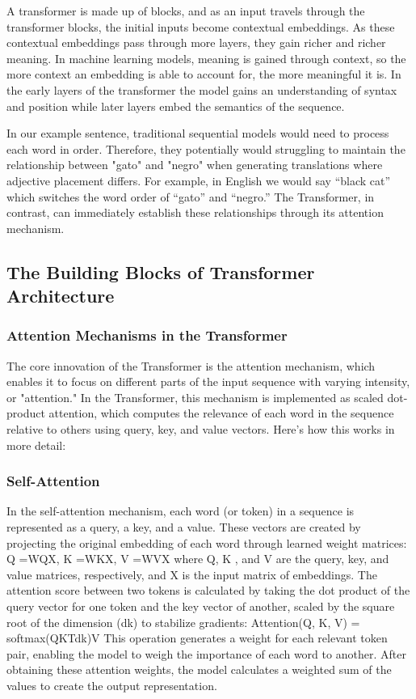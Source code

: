 A transformer is made up of blocks, and as an input travels through the transformer blocks, the initial inputs become contextual embeddings. As these contextual embeddings pass through more layers, they gain richer and richer meaning. In machine learning models, meaning is gained through context, so the more context an embedding is able to account for, the more meaningful it is. In the early layers of the transformer the model gains an understanding of syntax and position while later layers embed the semantics of the sequence. 

In our example sentence, traditional sequential models would need to process each word in order. Therefore, they potentially would struggling to maintain the relationship between "gato" and "negro" when generating translations where adjective placement differs. For example, in English we would say “black cat” which switches the word order of “gato” and “negro.” The Transformer, in contrast, can immediately establish these relationships through its attention mechanism.

\subsection{The Building Blocks of Transformer Architecture}

\subsubsection{Attention Mechanisms in the Transformer}
The core innovation of the Transformer is the attention mechanism, which enables it to focus on different parts of the input sequence with varying intensity, or "attention." In the Transformer, this mechanism is implemented as scaled dot-product attention, which computes the relevance of each word in the sequence relative to others using query, key, and value vectors. Here’s how this works in more detail:

\subsubsection{Self-Attention}
In the self-attention mechanism, each word (or token) in a sequence is represented as a query, a key, and a value. These vectors are created by projecting the original embedding of each word through learned weight matrices: 
Q =WQX, K =WKX, V =WVX 
where Q, K , and V are the query, key, and value matrices, respectively, and X is the input matrix of embeddings. The attention score between two tokens is calculated by taking the dot product of the query vector for one token and the key vector of another, scaled by the square root of the dimension (dk) to stabilize gradients:
	Attention(Q, K, V) = softmax(QKTdk)V
This operation generates a weight for each relevant token pair, enabling the model to weigh the importance of each word to another. After obtaining these attention weights, the model calculates a weighted sum of the values to create the output representation.

